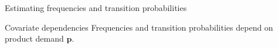 \documentclass[slides]{beamer}
\begin{document}
\begin{frame}{Estimating frequencies and transition probabilities}
\begin{block}{Covariate dependencies}
Frequencies and transition probabilities depend on product demand $\boldsymbol{p}$.
\end{block}
\end{frame}
\end{document}
